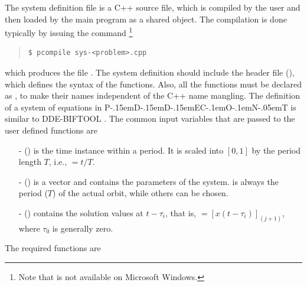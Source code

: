 \documentclass[10pt,a4paper]{ddedoc}
\def\pdde{{P\kern-.15emD\kern-.15emD\kern-.15emE\raisebox{.25ex}{-}C\kern-.1emO\kern-.1emN\kern-.05emT}}
\begin{document}
The system definition file is a C++ source file, which is compiled by the user
and then loaded by the main program  as a shared object. The
compilation is done typically by issuing the command%
\footnote{Note that  is not available on Microsoft Windows.}
{ \small \begin{quote} \begin{lstlisting}[basicstyle=\tt,frame=single]
$ pcompile sys-<problem>.cpp
\end{lstlisting} \end{quote} } \noindent
which produces the file .
The system definition should include the header file 
(), which defines the syntax of the functions. Also, all
the functions must be declared as , to make their names
independent of the C++ name mangling. The definition of a system of equations in
\pdde{} is similar to DDE-BIFTOOL \cite{DDEBIF}. The common input variables that
are passed to the user defined functions are
\begin{itemize}
  \item[-]  () is the time instance within a period. It is
  scaled into $[ 0, 1 ]$ by the period length $T$, i.e., $ = t/T$.
  \item[-]  () is a vector and contains the parameters of
  the system.  is always the period ($T$) of the actual orbit,
  while others can be chosen.
  \item[-]  () contains the solution values at $t -
  \tau_i$, that is, $= [ x ( t - \tau_i ) ]_{(j+1)}$, where
$\tau_0$ is generally zero.
\end{itemize}
The required functions are
\end{document}
